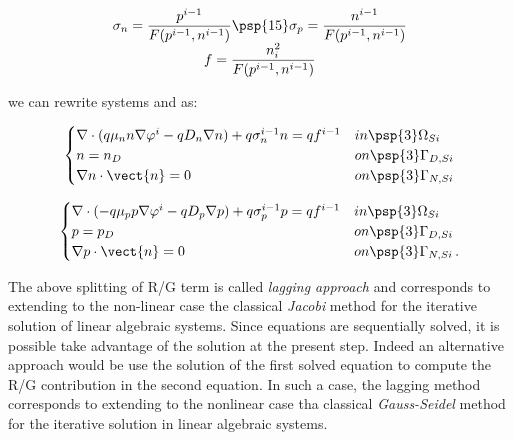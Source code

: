 \begin{equation}
\begin{array}{c}
\sigma_n  = \dfrac{p^{i-1}}{F(p^{i-1},n^{i-1})} \psp{15} \sigma_p   = \dfrac{n^{i-1}}{F(p^{i-1},n^{i-1})} \\
f  = \dfrac{n_i^2}{F(p^{i-1},n^{i-1})}
\end{array}
\end{equation}

we can rewrite systems  and  as:

\begin{equation}
\label{eq: LEC system new}
\begin{cases}
 \nabla \cdot ( q\mu_n n \nabla \varphi^i - qD_n \nabla n ) +q\sigma_n^{i-1} n = qf^{i-1} & in \psp{3} \Omega_{Si}
 \\
 n = n_D & on \psp{3} \Gamma_{D,Si}
 \\
 \nabla n \cdot \vect{n} = 0 & on \psp{3} \Gamma_{N,Si}
\end{cases}
\end{equation}

\begin{equation}
\label{eq: LHC system new}
\begin{cases}
\nabla \cdot (- q\mu_p p \nabla \varphi^i - qD_p \nabla p ) + q\sigma_p^{i-1} p =  qf^{i-1}& in \psp{3} \Omega_{Si}
\\
 p = p_D & on \psp{3} \Gamma_{D,Si}
 \\
 \nabla p \cdot \vect{n} = 0 & on \psp{3} \Gamma_{N,Si}\, .
\end{cases}
\end{equation}


The above splitting of R/G term is called \textit{lagging approach} \cite{Jerome:AnalyCharTran} and corresponds to extending to the non-linear case the classical \textit{Jacobi} method for the iterative  solution of linear algebraic systems. Since equations are sequentially solved, it is possible take advantage of the solution at the present step. Indeed an alternative approach would be use the solution of the first solved equation to compute the R/G contribution in the second equation. In such a case, the lagging method corresponds to extending to the nonlinear case tha classical \textit{Gauss-Seidel} method for the iterative solution in linear algebraic systems.


